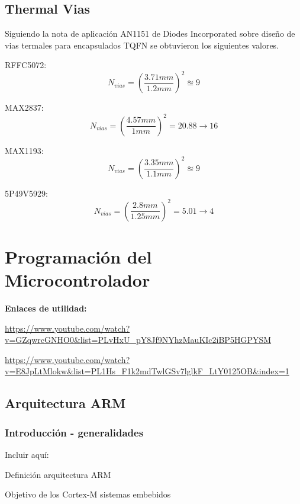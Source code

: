 \documentclass[a4paper,12pt]{report} %
\begin{document}
\section{Thermal Vias}

Siguiendo la nota de aplicación AN1151\cite{thvias} de Diodes Incorporated sobre diseño de vias termales para encapsulados TQFN se obtuvieron los siguientes valores.

RFFC5072:
\begin{equation}
	N_{vias} = \left(\frac{3.71mm}{1.2mm}\right)^2 \approxeq 9
\end{equation}

MAX2837:
\begin{equation}
	N_{vias} = \left(\frac{4.57mm}{1mm}\right)^2 = 20.88 \rightarrow 16
\end{equation}

MAX1193:
\begin{equation}
	N_{vias} = \left(\frac{3.35mm}{1.1mm}\right)^2 \approxeq 9
\end{equation}

5P49V5929:
\begin{equation}
	N_{vias} = \left(\frac{2.8mm}{1.25mm}\right)^2 = 5.01 \rightarrow 4
\end{equation}

\chapter{Programación del Microcontrolador}


\textbf{Enlaces de utilidad:}

\url{https://www.youtube.com/watch?v=GZqwrcGNHO0&list=PLvHxU_pY8Jf9NYhzMauKIc2iBP5HGPYSM}

\url{https://www.youtube.com/watch?v=E8JpLtMlokw&list=PL1Hs_F1k2mdTwlGSv7lglkF_LtY0125OB&index=1}

\section{Arquitectura ARM}

\subsection{Introducción - generalidades}

Incluir aquí: 

Definición arquitectura ARM

Objetivo de los Cortex-M sistemas embebidos
\end{document}
